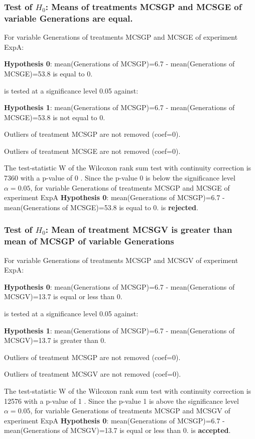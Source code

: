 \documentclass[18pt,c]{beamer}
\begin{document}
\begin{frame}[t]
 \frametitle{Test of $H_{0}$: Means of treatments MCSGP and MCSGE of variable Generations are equal. }
 \scriptsize
 For variable Generations of treatments MCSGP and MCSGE of experiment ExpA:

\vspace{1mm}
{\bf Hypothesis 0}: mean(Generations of MCSGP)=6.7 - mean(Generations of MCSGE)=53.8 is equal to 0.


 \begin{center} is tested at a significance level 0.05 against: \end{center}

{\bf Hypothesis 1}: mean(Generations of MCSGP)=6.7 - mean(Generations of MCSGE)=53.8 is not equal to 0.
\vspace{1mm}
\vspace{1mm}

 Outliers of treatment MCSGP  are not removed (coef=0).

 Outliers of treatment MCSGE  are not removed (coef=0).
\vspace{1mm}
 
 The test-statistic W of the Wilcoxon rank sum test with continuity correction is 7360 with a p-value of 0 .
 Since the p-value 0 is below the significance level $\alpha= 0.05 $,
 for variable Generations of treatments MCSGP and MCSGE of experiment ExpA 
 {\bf Hypothesis 0}: mean(Generations of MCSGP)=6.7 - mean(Generations of MCSGE)=53.8 is equal to 0.
is {\bf rejected}.

 \end{frame}
\begin{frame}[t]
 \frametitle{Test of $H_{0}$: Mean of treatment MCSGV is greater than mean of MCSGP of variable Generations }
 \scriptsize
 For variable Generations of treatments MCSGP and MCSGV of experiment ExpA:

\vspace{1mm}
{\bf Hypothesis 0}: mean(Generations of MCSGP)=6.7 - mean(Generations of MCSGV)=13.7 is equal or less than 0.


 \begin{center} is tested at a significance level 0.05 against: \end{center}

{\bf Hypothesis 1}: mean(Generations of MCSGP)=6.7 - mean(Generations of MCSGV)=13.7 is greater than 0.
\vspace{1mm}
\vspace{1mm}

 Outliers of treatment MCSGP  are not removed (coef=0).

 Outliers of treatment MCSGV  are not removed (coef=0).
\vspace{1mm}
 
 The test-statistic W of the Wilcoxon rank sum test with continuity correction is 12576 with a p-value of 1 .
 Since the p-value 1 is above the significance level $\alpha= 0.05 $,
 for variable Generations of treatments MCSGP and MCSGV of experiment ExpA 
 {\bf Hypothesis 0}: mean(Generations of MCSGP)=6.7 - mean(Generations of MCSGV)=13.7 is equal or less than 0.
is {\bf accepted}.

 \end{frame}
\end{document}
